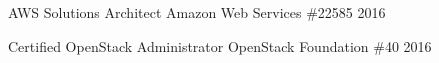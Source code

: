 

\begin{cvhonors}

  \cvhonor
    {AWS Solutions Architect}
    {Amazon Web Services}
    {\#22585}
    {2016} %

  \cvhonor
    {Certified OpenStack Administrator}
    {OpenStack Foundation}
    {\#40}
    {2016} %

\end{cvhonors}
